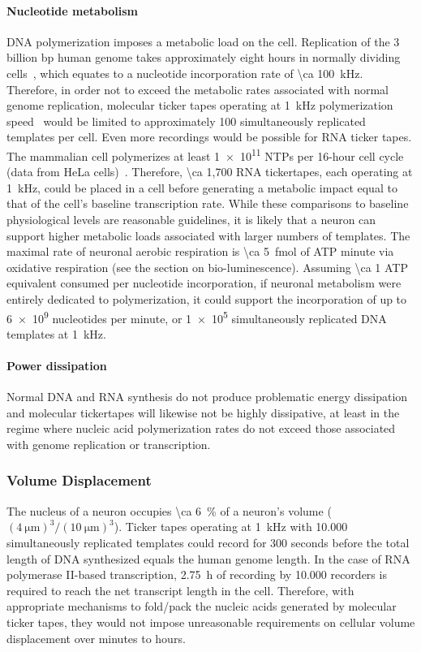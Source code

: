 \paragraph{Nucleotide metabolism}
DNA polymerization imposes a metabolic load on the cell.
Replication of the 3 billion bp human genome takes approximately eight hours in normally dividing cells~\cite{murray12}, which equates to a nucleotide incorporation rate of \SI{\ca 100}{\kHz}.
Therefore, in order not to exceed the metabolic rates associated with normal genome replication, molecular ticker tapes operating at \SI{1}{\kHz} polymerization speed~\cite{kelman95} would be limited to approximately 100 simultaneously replicated templates per cell.
Even more recordings would be possible for RNA ticker tapes.
The mammalian cell polymerizes at least \num{1e11} NTPs per 16-hour cell cycle (data from HeLa cells)~\cite{jackson00}.
Therefore, \num{\ca 1,700} RNA tickertapes, each operating at \SI{1}{\kHz}, could be placed in a cell before generating a metabolic impact equal to that of the cell's baseline transcription rate.
While these comparisons to baseline physiological levels are reasonable guidelines, it is likely that a neuron can support higher metabolic loads associated with larger numbers of templates.
The maximal rate of neuronal aerobic respiration is \SI{\ca 5}{\femto\mole} of ATP minute via oxidative respiration (see the section on bio-luminescence). Assuming \num{\ca 1} ATP equivalent consumed per nucleotide incorporation, if neuronal metabolism were entirely dedicated to polymerization, it could support the incorporation of up to \num{6e9} nucleotides per minute, or \num{1e5} simultaneously replicated DNA templates at \SI{1}{\kHz}. %

\paragraph{Power dissipation}
Normal DNA and RNA synthesis do not produce problematic energy dissipation and molecular tickertapes will likewise not be highly dissipative, at least in the regime where nucleic acid polymerization rates do not exceed those associated with genome replication or transcription.

\subsubsection{Volume Displacement}

The nucleus of a neuron occupies \SI{\ca 6}{\percent} of a neuron's volume ($(\SI{4}{\um})^3/(\SI{10}{\um})^3$).
Ticker tapes operating at \SI{1}{\kHz} with \num{10,000} simultaneously replicated templates could record for \num{300} seconds before the total length of DNA synthesized equals the human genome length.
In the case of RNA polymerase II-based transcription, \SI{2.75}{\hour} of recording by \num{10,000} recorders is required to reach the net transcript length in the cell.
Therefore, with appropriate mechanisms to fold/pack the nucleic acids generated by molecular ticker tapes, they would not impose unreasonable requirements on cellular volume displacement over minutes to hours.

